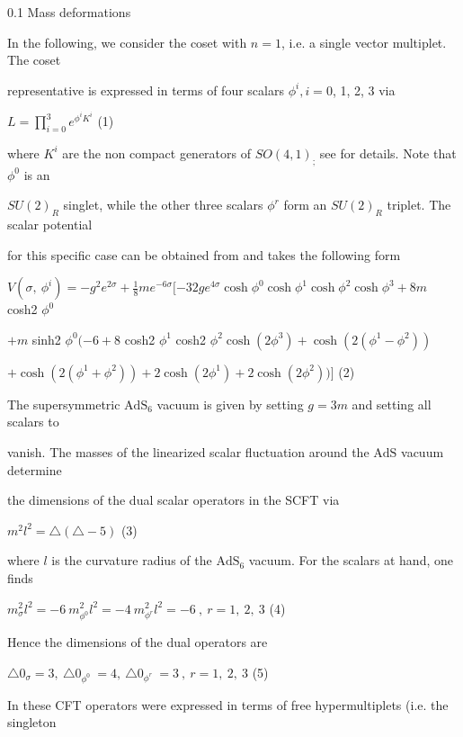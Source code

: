 \documentclass[a4paper,12pt]{article}
\begin{document}
0.1 Mass deformations

In the following, we consider the coset with $n= 1$, i.e. a single vector multiplet. The coset

representative is expressed in terms of four scalars $\phi^{i}, i=0$, 1, 2, 3 via
\begin{center}
$L=\displaystyle \prod_{i=0}^{3}e^{\phi^{i}K^{i}}$   (1)
\end{center}
where $K^{i}$ are the non compact generators of $SO(4,1)_{;}$ see for details. Note that $\phi^{0}$ is an

$SU(2)_{R}$ singlet, while the other three scalars $\phi^{r}$ form an $SU(2)_{R}$ triplet. The scalar potential

for this specific case can be obtained from and takes the following form

$V(\displaystyle \sigma,\ \phi^{i})=-g^{2}e^{2\sigma}+\frac{1}{8}me^{-6\sigma}[-32ge^{4\sigma}\cosh\phi^{0}\cosh\phi^{1}\cosh\phi^{2}\cosh\phi^{3}+8m$ cosh2 $\phi^{0}$

$+m$ sinh2 $\phi^{0}(-6+8$ cosh2 $\phi^{1}$ cosh2 $\phi^{2}\cosh(2\phi^{3})+\cosh(2(\phi^{1}-\phi^{2}))$
\begin{center}
$+\cosh(2(\phi^{1}+\phi^{2}))+2\cosh(2\phi^{1})+2\cosh(2\phi^{2}))]$   (2)
\end{center}
The supersymmetric $\mathrm{A}\mathrm{d}\mathrm{S}_{6}$ vacuum is given by setting $g = 3m$ and setting all scalars to

vanish. The masses of the linearized scalar fluctuation around the $\mathrm{A}\mathrm{d}\mathrm{S}$ vacuum determine

the dimensions of the dual scalar operators in the SCFT via
\begin{center}
$m^{2}l^{2}=\triangle(\triangle-5)$   (3)
\end{center}
where $l$ is the curvature radius of the $\mathrm{A}\mathrm{d}\mathrm{S}_{6}$ vacuum. For the scalars at hand, one finds
\begin{center}
$m_{\sigma}^{2}l^{2}=-6\ m_{\phi^{0}}^{2}l^{2}=-4\ m_{\phi^{r}}^{2}l^{2}=-6\ ,\ r=1,\ 2,\ 3$   (4)
\end{center}
Hence the dimensions of the dual operators are
\begin{center}
$\triangle 0_{\sigma}=3,\ \triangle 0_{\phi^{0}}\ =4,\ \triangle 0_{\phi^{r}}\ =3\ ,\ r=1,\ 2,\ 3$   (5)
\end{center}
In these CFT operators were expressed in terms of free hypermultiplets (i.e. the singleton
\end{document}
